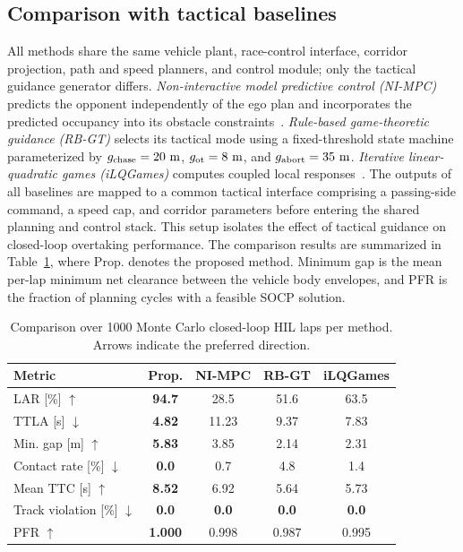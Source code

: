 \documentclass[journal,twoside,web]{ieeecolor}
\begin{document}

\subsection{Comparison with tactical baselines}
\label{subsec:comparison}

All methods share the same vehicle plant, race-control interface, corridor
projection, path and speed planners, and control module; only the tactical
guidance generator differs. \emph{Non-interactive model predictive control
(NI-MPC)} predicts the opponent
independently of the ego plan and incorporates the predicted occupancy into its
obstacle constraints~\cite{kabzan2020amzracing,betz2023autonomous}.
\emph{Rule-based game-theoretic guidance (RB-GT)} selects its tactical mode
using a fixed-threshold state machine parameterized by
\(g_{\rm chase}=20~\mathrm{m}\),
\(g_{\rm ot}=8~\mathrm{m}\), and \(g_{\rm abort}=35~\mathrm{m}\).
\emph{Iterative linear-quadratic games (iLQGames)} computes coupled local
responses~\cite{fridovich2020ilqgames}. The outputs
of all baselines are mapped to a common tactical interface comprising a
passing-side command, a speed cap, and corridor parameters before entering the
shared planning and control stack. This setup isolates the effect of tactical
guidance on closed-loop overtaking performance. The comparison results are
summarized in Table~\ref{tab:comparison}, where Prop. denotes the proposed
method. Minimum gap is the mean per-lap
minimum net clearance between the vehicle body envelopes, and PFR is the
fraction of planning cycles with a feasible SOCP solution.

\begin{table}[H]
\centering
\footnotesize
\setlength{\tabcolsep}{2.3pt}
\renewcommand{\arraystretch}{1.08}
\caption{Comparison over 1000 Monte Carlo closed-loop HIL laps per method.
Arrows indicate the preferred direction.}
\label{tab:comparison}
\begin{tabular}{@{}lcccc@{}}
\toprule
Metric & Prop. & NI-MPC & RB-GT & iLQGames \\
\midrule
LAR [\%] $\uparrow$
& \textbf{94.7} & 28.5 & 51.6 & 63.5 \\
TTLA [s] $\downarrow$
& \textbf{4.82} & 11.23 & 9.37 & 7.83 \\
Min. gap [m] $\uparrow$
& \textbf{5.83} & 3.85 & 2.14 & 2.31 \\
Contact rate [\%] $\downarrow$
& \textbf{0.0} & 0.7 & 4.8 & 1.4 \\
Mean TTC [s] $\uparrow$
& \textbf{8.52} & 6.92 & 5.64 & 5.73 \\
Track violation [\%] $\downarrow$
& \textbf{0.0} & \textbf{0.0} & \textbf{0.0} & \textbf{0.0} \\
PFR $\uparrow$
& \textbf{1.000} & 0.998 & 0.987 & 0.995 \\
\bottomrule
\end{tabular}
\end{table}
\end{document}
